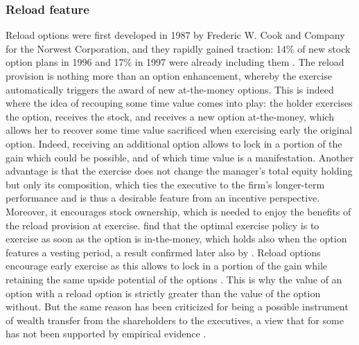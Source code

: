 \subsubsection{Reload feature}
    Reload options were first developed in 1987 by Frederic W. Cook and Company for the Norwest Corporation, and they rapidly gained traction: 14\% of new stock option plans in 1996 and 17\% in 1997 were already including them \citep{dybvig2003employee}.
    The reload provision is nothing more than an option enhancement, whereby the exercise automatically triggers the award of new at-the-money options. This is indeed where the idea of recouping some time value comes into play: the holder exercises the option, receives the stock, and receives a new option at-the-money, which allows her to recover some time value sacrificed when exercising early the original option. Indeed, receiving an additional option allows to lock in a portion of the gain which could be possible, and of which time value is a manifestation. Another advantage is that the exercise does not change the manager's total equity holding but only its composition, which ties the executive to the firm's longer-term performance and is thus a desirable feature from an incentive perspective. Moreover, it encourages stock ownership, which is needed to enjoy the benefits of the reload provision at exercise. 
    \citet{hemmer2000reload} find that the optimal exercise policy is to exercise as soon as the option is in-the-money, which holds also when the option features a vesting period, a result confirmed later also by \citet{dybvig2003employee}. Reload options encourage early exercise as this allows to lock in a portion of the gain while retaining the same upside potential of the options \citep{hemmer1998optimal}. This is why the value of an option with a reload option is strictly greater than the value of the option without. But the same reason has been criticized for being a possible instrument of wealth transfer from the shareholders to the executives, a view that for some has not been supported by empirical evidence \citep{dybvig2003employee}.
